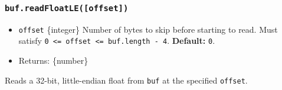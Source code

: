 \begin{Shaded}
\begin{Highlighting}[]
\NormalTok{ \{ }\NormalTok{ \} }\OperatorTok{=} \NormalTok{(}\NormalTok{)}\OperatorTok{;}

\OperatorTok{=} \NormalTok{([}\OperatorTok{,} \OperatorTok{,} \OperatorTok{,} \NormalTok{])}\OperatorTok{;}

\NormalTok{(}\NormalTok{))}\OperatorTok{;}
\end{Highlighting}
\end{Shaded}

\subsubsection{\texorpdfstring{\texttt{buf.readFloatLE({[}offset{]})}}{buf.readFloatLE({[}offset{]})}}\label{buf.readfloatleoffset}

\begin{itemize}
\tightlist
\item
  \texttt{offset} \{integer\} Number of bytes to skip before starting to
  read. Must satisfy
  \texttt{0\ \textless{}=\ offset\ \textless{}=\ buf.length\ -\ 4}.
  \textbf{Default:} \texttt{0}.
\item
  Returns: \{number\}
\end{itemize}

Reads a 32-bit, little-endian float from \texttt{buf} at the specified
\texttt{offset}.

\begin{Shaded}
\begin{Highlighting}[]
\NormalTok{ \{ }\NormalTok{ \} } \OperatorTok{;}

\OperatorTok{=} \NormalTok{([}\OperatorTok{,} \OperatorTok{,} \OperatorTok{,} \NormalTok{])}\OperatorTok{;}

\NormalTok{(}\NormalTok{))}\OperatorTok{;}
\NormalTok{(}\NormalTok{))}\OperatorTok{;}
\end{Highlighting}
\end{Shaded}


